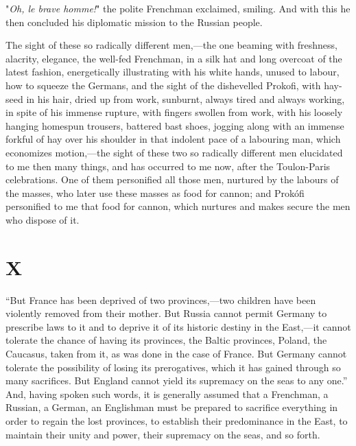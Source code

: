 \documentclass{book}
\begin{document}
"\emph{Oh, le brave homme!}" the polite Frenchman exclaimed, smiling. And with this he then concluded his diplomatic mission to the Russian people.

The sight of these so radically different men,—the one beaming with freshness, alacrity, elegance, the well-fed Frenchman, in a silk hat and long overcoat of the latest fashion, energetically illustrating with his white hands, unused to labour, how to squeeze the Germans, and the sight of the dishevelled Prokofi, with hay-seed in his hair, dried up from work, sunburnt, always tired and always working, in spite of his immense rupture, with fingers swollen from work, with his loosely hanging homespun trousers, battered bast shoes, jogging along with an immense forkful of hay over his shoulder in that indolent pace of a labouring man, which economizes motion,—the sight of these two so radically different men elucidated to me then many things, and has occurred to me now, after the Toulon-Paris celebrations. One of them personified all those men, nurtured by the labours of the masses, who later use these masses as food for cannon; and Prokófi personified to me that food for cannon, which nurtures and makes secure the men who dispose of it.

\chapter{X}
\label{chapter-10}
“But France has been deprived of two provinces,—two children have been violently removed from their mother. But Russia cannot permit Germany to prescribe laws to it and to deprive it of its historic destiny in the East,—it cannot tolerate the chance of having its provinces, the Baltic provinces, Poland, the Caucasus, taken from it, as was done in the case of France. But Germany cannot tolerate the possibility of losing its prerogatives, which it has gained through so many sacrifices. But England cannot yield its supremacy on the seas to any one.” And, having spoken such words, it is generally assumed that a Frenchman, a Russian, a German, an Englishman must be prepared to sacrifice everything in order to regain the lost provinces, to establish their predominance in the East, to maintain their unity and power, their supremacy on the seas, and so forth.
\end{document}
